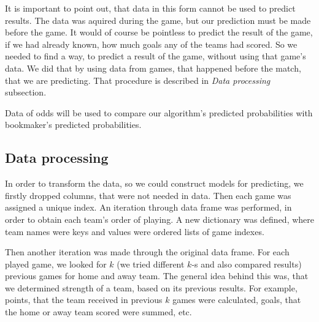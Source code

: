 \documentclass[conference]{IEEEtran}
\begin{document}
It is important to point out, that data in this form cannot be used to predict results. The data was aquired during the game,
but our prediction must be made before the game. It would of course be pointless to predict the result of the game, if we had 
already known, how much goals any of the teams had scored. So we needed to find a way, to predict a result of the game, without using that game's data. We did that by using data from games, that happened before the match, that we are predicting. 
That procedure is described in \emph{Data processing} subsection.

Data of odds will be used to compare our algorithm's predicted probabilities with bookmaker's predicted probabilities.

\subsection{Data processing}

In order to transform the data, so we could construct models for predicting, we firstly dropped columns, that were not needed
in data. Then each game was assigned a unique index. An iteration through data frame was performed, in order to obtain each team's
order of playing. A new dictionary was defined, where team names were keys and values were ordered lists of game indexes. 

Then another iteration was made through the original data frame. For each played game, we looked for $k$ (we tried different $k$-s
and also compared results) previous games for home and away team. The general idea behind this was, that we determined strength of
a team, based on its previous results. For example, points, that the team received in previous $k$ games were calculated, goals, that the home or away team scored were summed, etc.
\end{document}
